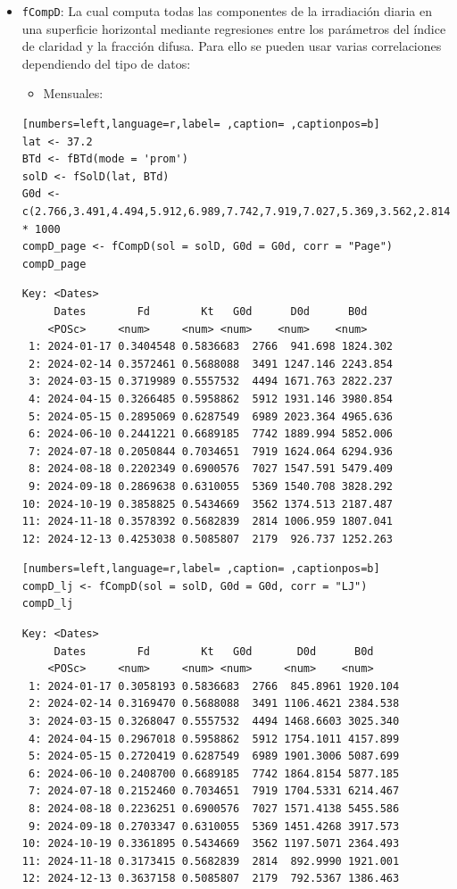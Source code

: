\begin{itemize}
\item \texttt{fCompD}: La cual computa todas las componentes de la irradiación diaria en una superficie horizontal mediante regresiones entre los parámetros del índice de claridad y la fracción difusa.
Para ello se pueden usar varias correlaciones dependiendo del tipo de datos:
\begin{itemize}
\item Mensuales:
\end{itemize}
\begin{lstlisting}[numbers=left,language=r,label= ,caption= ,captionpos=b]
lat <- 37.2
BTd <- fBTd(mode = 'prom')
solD <- fSolD(lat, BTd)
G0d <- c(2.766,3.491,4.494,5.912,6.989,7.742,7.919,7.027,5.369,3.562,2.814,2.179) * 1000
compD_page <- fCompD(sol = solD, G0d = G0d, corr = "Page")
compD_page
\end{lstlisting}

\begin{verbatim}
Key: <Dates>
	 Dates        Fd        Kt   G0d      D0d      B0d
	<POSc>     <num>     <num> <num>    <num>    <num>
 1: 2024-01-17 0.3404548 0.5836683  2766  941.698 1824.302
 2: 2024-02-14 0.3572461 0.5688088  3491 1247.146 2243.854
 3: 2024-03-15 0.3719989 0.5557532  4494 1671.763 2822.237
 4: 2024-04-15 0.3266485 0.5958862  5912 1931.146 3980.854
 5: 2024-05-15 0.2895069 0.6287549  6989 2023.364 4965.636
 6: 2024-06-10 0.2441221 0.6689185  7742 1889.994 5852.006
 7: 2024-07-18 0.2050844 0.7034651  7919 1624.064 6294.936
 8: 2024-08-18 0.2202349 0.6900576  7027 1547.591 5479.409
 9: 2024-09-18 0.2869638 0.6310055  5369 1540.708 3828.292
10: 2024-10-19 0.3858825 0.5434669  3562 1374.513 2187.487
11: 2024-11-18 0.3578392 0.5682839  2814 1006.959 1807.041
12: 2024-12-13 0.4253038 0.5085807  2179  926.737 1252.263
\end{verbatim}

\begin{lstlisting}[numbers=left,language=r,label= ,caption= ,captionpos=b]
compD_lj <- fCompD(sol = solD, G0d = G0d, corr = "LJ")
compD_lj
\end{lstlisting}

\begin{verbatim}
Key: <Dates>
	 Dates        Fd        Kt   G0d       D0d      B0d
	<POSc>     <num>     <num> <num>     <num>    <num>
 1: 2024-01-17 0.3058193 0.5836683  2766  845.8961 1920.104
 2: 2024-02-14 0.3169470 0.5688088  3491 1106.4621 2384.538
 3: 2024-03-15 0.3268047 0.5557532  4494 1468.6603 3025.340
 4: 2024-04-15 0.2967018 0.5958862  5912 1754.1011 4157.899
 5: 2024-05-15 0.2720419 0.6287549  6989 1901.3006 5087.699
 6: 2024-06-10 0.2408700 0.6689185  7742 1864.8154 5877.185
 7: 2024-07-18 0.2152460 0.7034651  7919 1704.5331 6214.467
 8: 2024-08-18 0.2236251 0.6900576  7027 1571.4138 5455.586
 9: 2024-09-18 0.2703347 0.6310055  5369 1451.4268 3917.573
10: 2024-10-19 0.3361895 0.5434669  3562 1197.5071 2364.493
11: 2024-11-18 0.3173415 0.5682839  2814  892.9990 1921.001
12: 2024-12-13 0.3637158 0.5085807  2179  792.5367 1386.463
\end{verbatim}


\end{itemize}

